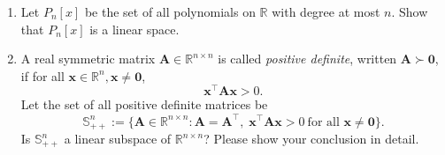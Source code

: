 \documentclass[11pt,letter,notitlepage]{article}
\theoremstyle{definition}
\begin{document}
\newpage
\begin{exercise}
\begin{enumerate}
    \item Let $P_n[x]$ be the set of all polynomials on $\mathbb{R}$ with degree at most $n$. Show that $P_n[x]$ is a linear space.

    \item A real symmetric matrix $\mathbf{A} \in \mathbb{R}^{n\times n}$ is called \emph{positive definite}, written $\mathbf A \succ \mathbf 0$, if for all $\mathbf x \in \mathbb{R}^n, \mathbf x\neq \mathbf 0$,
    \[
    \mathbf x^\top\mathbf A \mathbf x > 0.
    \]
    Let the set of all positive definite matrices be
    \[
    \mathbb S^n_{++} := \Big\{\mathbf A \in \mathbb R^{n\times n} : \mathbf A = \mathbf A^\top,\;\mathbf x^\top \mathbf A \mathbf x > 0\ \text{for all }\mathbf x\neq \mathbf 0\Big\}.
    \]
    Is $\mathbb S^n_{++}$ a linear subspace of $\mathbb R^{n\times n}$? Please show your conclusion in detail.
    
\end{enumerate}
    
\end{exercise}
\end{document}
